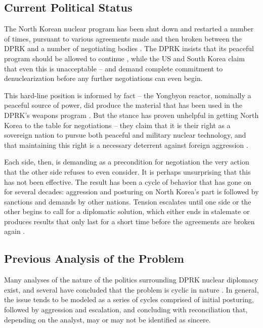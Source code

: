 \documentclass{article}
\begin{document}

\subsection{Current Political Status}

The North Korean nuclear program has been shut down and restarted a number of times, pursuant to various agreements made and then broken between the DPRK and a number of negotiating bodies \cite{bajoria,davenport}. The DPRK insists that its peaceful program should be allowed to continue \cite{kcna2}, while the US and South Korea claim that even this is unacceptable \cite{lee} – and demand complete commitment to denuclearization before any further negotiations can even begin.

This hard-line position is informed by fact – the Yongbyon reactor, nominally a peaceful source of power, did produce the material that has been used in the DPRK’s weapons program \cite{hecker}. But the stance has proven unhelpful in getting North Korea to the table for negotiations – they claim that it is their right as a sovereign nation to pursue both peaceful and military nuclear technology, and that maintaining this right is a necessary deterrent against foreign aggression \cite{kcna,kcna2}.

Each side, then, is demanding as a precondition for negotiation the very action that the other side refuses to even consider. It is perhaps unsurprising that this has not been effective. The result has been a cycle of behavior that has gone on for several decades: aggression and posturing on North Korea’s part is followed by sanctions and demands by other nations. Tension escalates until one side or the other begins to call for a diplomatic solution, which either ends in stalemate or produces results that only last for a short time before the agreements are broken again \cite{bajoria, davenport}.

\subsection{Previous Analysis of the Problem}

Many analyses of the nature of the politics surrounding DPRK nuclear diplomacy exist, and several have concluded that the problem is cyclic in nature \cite{blair,cfr,fisher,gause,habib,jun}. In general, the issue tends to be modeled as a series of cycles comprised of initial posturing, followed by aggression and escalation, and concluding with reconciliation that, depending on the analyst, may or may not be identified as sincere.
\end{document}
